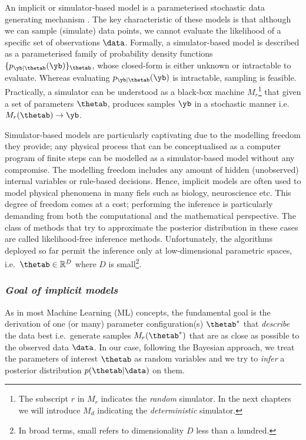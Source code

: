 An implicit or simulator-based model is a parameterised stochastic
data generating mechanism \cite{Gutmann2016}. The key characteristic
of these models is that although we can sample (simulate) data points,
we cannot evaluate the likelihood of a specific set of observations
$\data$. Formally, a simulator-based model is described as a
parameterised family of probability density functions
$\{ p_{\yb|\thetab}(\yb) \}_{\thetab}$, whose closed-form is either
unknown or intractable to evaluate. Whereas evaluating
$p_{\yb|\thetab}(\yb)$ is intractable, sampling is
feasible. Practically, a simulator can be understood as a black-box
machine $M_r$\footnote{The subscript $r$ in $M_r$ indicates the
  \textit{random} simulator. In the next chapters we will introduce
  $M_d$ indicating the \textit{deterministic} simulator.} that
given a set of parameters $\thetab$, produces samples $\yb$ in a
stochastic manner i.e.\ $M_r(\thetab) \rightarrow \yb$.

Simulator-based models are particularly captivating due to the
modelling freedom they provide; any physical process that can be
conceptualised as a computer program of finite steps can be modelled
as a simulator-based model without any compromise. The modelling
freedom includes any amount of hidden (unobserved) internal variables
or rule-based decisions. Hence, implicit models are often used to
model physical phenomena in many fiels such as biology, neuroscience
etc. This degree of freedom comes at a cost; performing the inference
is particularly demanding from both the computational and the
mathematical perspective. The class of methods that try to approximate
the posterior distribution in these cases are called likelihood-free
inference methods. Unfortunately, the algorithms deployed so far
permit the inference only at low-dimensional parametric spaces,
i.e.\ $\thetab \in \mathbb{R}^D$ where $D$ is small\footnote{In broad terms, small refers to dimensionality $D$ less than a hundred.}.

\subsubsection*{\textit{Goal of implicit models}}

As in most Machine Learning (ML) concepts, the fundamental goal is the
derivation of one (or many) parameter configuration(s) $\thetab^*$
that \textit{describe} the data best i.e.\ generate
samples $M_r(\thetab^*)$ that are as close as possible to the observed
data $\data$. In our case, following the Bayesian approach, we treat
the parameters of interest $\thetab$ as random variables and we try to
\textit{infer} a posterior distribution $p(\thetab|\data)$ on them.
